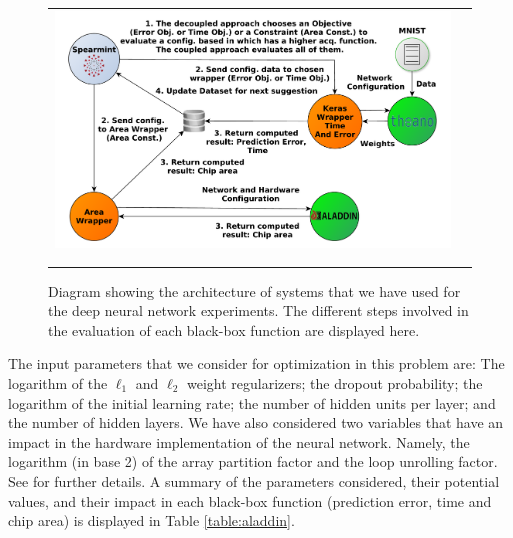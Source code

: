 \documentclass[review,preprint,12pt]{elsarticle}
\begin{document}
\begin{figure}[htb]
\begin{center}
        \begin{tabular}{cc}
                \vspace{-.2cm}
                \includegraphics[width=0.99\linewidth]{figures/real/diagrams/architecture_real_hard_exp.pdf} \\ \\
                \vspace{-.1cm}
        \end{tabular}
        \caption{Diagram showing the architecture of systems that we have used for the deep neural network experiments.
		The different steps involved in the evaluation of each black-box function are displayed here.}
        \label{fig:arch_alad}
\end{center}
\end{figure}

The input parameters that we consider for optimization in this problem are: 
The logarithm of the $\ell_1$  and $\ell_2$ weight regularizers; 
the dropout probability; the logarithm of the initial learning 
rate; the number of hidden units per layer; and the number of hidden layers. We have also 
considered two variables that have an impact in the hardware implementation 
of the neural network. Namely, the logarithm (in base 2) of the array partition factor 
and the loop unrolling factor. See \citep{shao2014aladdin} for further details. 
A summary of the parameters considered, their potential values, and their impact in each 
black-box function (prediction error, time and chip area) is displayed in Table \ref{table:aladdin}.
\end{document}
